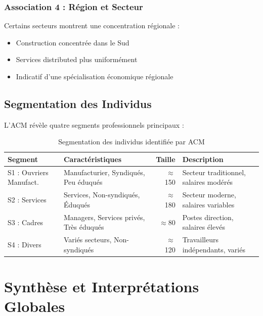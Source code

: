 \documentclass[12pt,a4paper]{report}
\begin{document}
\subsubsection{Association 4 : Région et Secteur}

Certains secteurs montrent une concentration régionale :

\begin{itemize}
    \item Construction concentrée dans le Sud
    \item Services distributed plus uniformément
    \item Indicatif d'une spécialisation économique régionale
\end{itemize}

\subsection{Segmentation des Individus}

L'ACM révèle quatre segments professionnels principaux :

\begin{table}[H]
\centering
\caption{Segmentation des individus identifiée par ACM}
\begin{tabular}{|l|p{4.5cm}|r|p{3cm}|}
\hline
\textbf{Segment} & \textbf{Caractéristiques} & \textbf{Taille} & \textbf{Description} \\
\hline
S1 : Ouvriers Manufact. & Manufacturier, Syndiqués, Peu éduqués & $\approx$150 & Secteur traditionnel, salaires modérés \\
\hline
S2 : Services & Services, Non-syndiqués, Éduqués & $\approx$180 & Secteur moderne, salaires variables \\
\hline
S3 : Cadres & Managers, Services privés, Très éduqués & $\approx$80 & Postes direction, salaires élevés \\
\hline
S4 : Divers & Variés secteurs, Non-syndiqués & $\approx$120 & Travailleurs indépendants, variés \\
\hline
\end{tabular}
\end{table}

\section{Synthèse et Interprétations Globales}
\end{document}
